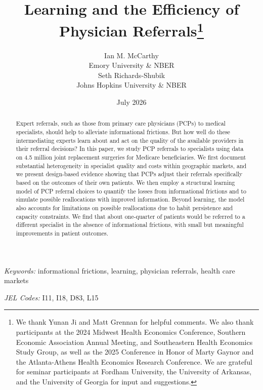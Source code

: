\documentclass[12pt]{article}
\begin{document}
\title{Learning and the Efficiency of Physician Referrals\thanks{We thank Yunan Ji and Matt Grennan for helpful comments. We also thank participants at the 2024 Midwest Health Economics Conference, Southern Economic Association Annual Meeting, and Southeastern Health Economics Study Group, as well as the 2025 Conference in Honor of Marty Gaynor and the Atlanta-Athens Health Economics Research Conference. We are grateful for seminar participants at Fordham University, the University of Arkansas, and the University of Georgia for input and suggestions.}}
\author{%
  Ian M. McCarthy \\[-1.5ex]
  Emory University \& NBER \\
  Seth Richards-Shubik \\[-1.5ex]
  Johns Hopkins University \& NBER
}
\date{July 2026}
\maketitle

\vspace{-2ex}
\begin{abstract}
\singlespacing
\noindent Expert referrals, such as those from primary care physicians (PCPs) to medical specialists, should help to alleviate informational frictions. But how well do these intermediating experts learn about and act on the quality of the available providers in their referral decisions? In this paper, we study PCP referrals to specialists using data on 4.5 million joint replacement surgeries for Medicare beneficiaries. We first document substantial heterogeneity in specialist quality and costs within geographic markets, and we present design-based evidence showing that PCPs adjust their referrals specifically based on the outcomes of their own patients. We then employ a structural learning model of PCP referral choices to quantify the losses from informational frictions and to simulate possible reallocations with improved information. Beyond learning, the model also accounts for limitations on possible reallocations due to habit persistence and capacity constraints. We find that about one-quarter of patients would be referred to a different specialist in the absence of informational frictions, with small but meaningful improvements in patient outcomes.
\end{abstract}

\medskip
\noindent \textit{Keywords:} informational frictions, learning, physician referrals, health care markets

\smallskip
\noindent \textit{JEL Codes:} I11, I18, D83, L15
\end{document}
